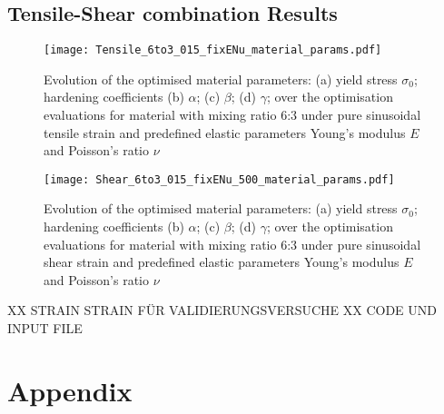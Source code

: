 \begin{appendices}
    \section{Tensile-Shear combination Results} \label{app:tensileShearResults}
    \begin{figure}[H]
    \centering
    \texttt{[image: Tensile\_6to3\_015\_fixENu\_material\_params.pdf]}
    \caption{Evolution of the optimised material parameters: (a) yield stress $\sigma_0$; hardening coefficients (b) $\alpha$; (c) $\beta$; (d) $\gamma$; over the optimisation evaluations for material with mixing ratio 6:3 under pure sinusoidal tensile strain and predefined elastic parameters Young's modulus $E$ and Poisson's ratio $\nu$}
    \label{fig:tensileMatParams}
    \end{figure}

    \begin{figure}[H]
    \centering
    \texttt{[image: Shear\_6to3\_015\_fixENu\_500\_material\_params.pdf]}
    \caption{Evolution of the optimised material parameters: (a) yield stress $\sigma_0$; hardening coefficients (b) $\alpha$; (c) $\beta$; (d) $\gamma$; over the optimisation evaluations for material with mixing ratio 6:3 under pure sinusoidal shear strain and predefined elastic parameters Young's modulus $E$ and Poisson's ratio $\nu$}
    \label{fig:shearMatParams}
    \end{figure}


    XX STRAIN STRAIN FÜR VALIDIERUNGSVERSUCHE
    XX CODE UND INPUT FILE
    \chapter{Appendix}
\end{appendices}